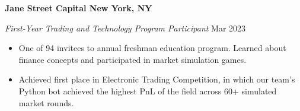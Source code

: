 \textbf{Jane Street Capital \hfill New York, NY}\par
\textit{First-Year Trading and Technology Program Participant} \hfill Mar 2023

\begin{itemize}
	\item One of 94 invitees to annual freshman education program. Learned about finance concepts and participated in market simulation games.
	\item Achieved first place in Electronic Trading Competition, in which our team's Python bot achieved the highest PnL of the field across 60+ simulated market rounds.
\end{itemize}\par